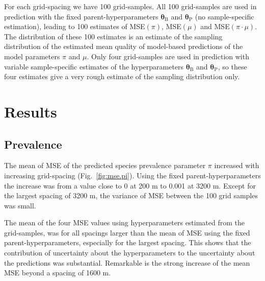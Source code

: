 \documentclass[review]{elsarticle}
\begin{document}
For each grid-spacing we have 100 grid-samples. All 100 grid-samples are used in prediction with the fixed parent-hyperparameters $\boldsymbol{\theta}_{\mathrm{B}}$ and $\boldsymbol{\theta}_{\mathrm{P}}$ (no sample-specific estimation), leading to 100 estimates of MSE$(\pi)$, MSE$(\mu)$ and MSE$(\pi \cdot \mu)$. The distribution of these 100 estimates is an estimate of the sampling distribution of the estimated mean quality of model-based predictions of the model parameters $\pi$ and $\mu$. Only four grid-samples are used in prediction with variable sample-specific estimates of the hyperparameters $\boldsymbol{\theta}_{\mathrm{B}}$ and $\boldsymbol{\theta}_{\mathrm{P}}$, so these four estimates give a very rough estimate of the sampling distribution only.

\section{Results} \label{sec:results}

\subsection{Prevalence}
The mean of MSE of the predicted species prevalence parameter $\pi$ increased with increasing grid-spacing (Fig.~\ref{fig:mse.pi}).
Using the fixed parent-hyperparameters the increase was from a value close to 0 at 200 m to 0.001 at 3200 m. Except for the largest spacing of 3200 m, the variance of MSE between the 100 grid samples was small.

The mean of the four MSE values using hyperparameters estimated from the grid-samples, was for all spacings larger than the mean of MSE using the fixed parent-hyperparameters, especially for the largest spacing. This shows that the contribution of uncertainty about the hyperparameters to the uncertainty about the predictions was substantial. Remarkable is the strong increase of the mean MSE beyond a spacing of 1600 m.
\end{document}
